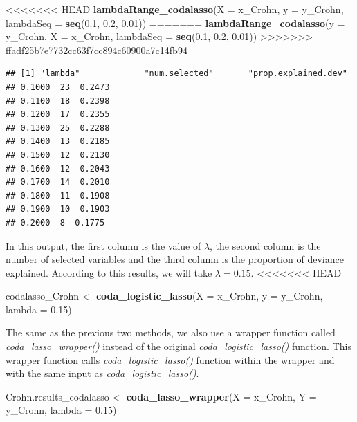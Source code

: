 \documentclass[openany]{book}
\newenvironment{Shaded}{\begin{snugshade}}{\end{snugshade}}
\newcommand{\KeywordTok}[1]{\textcolor[rgb]{0.13,0.29,0.53}{\textbf{#1}}}
\newcommand{\DataTypeTok}[1]{\textcolor[rgb]{0.13,0.29,0.53}{#1}}
\newcommand{\FloatTok}[1]{\textcolor[rgb]{0.00,0.00,0.81}{#1}}
\newcommand{\StringTok}[1]{\textcolor[rgb]{0.31,0.60,0.02}{#1}}
\newcommand{\NormalTok}[1]{#1}
\begin{document}
\begin{Shaded}
\begin{Highlighting}[]
<<<<<<< HEAD
\KeywordTok{lambdaRange_codalasso}\NormalTok{(}\DataTypeTok{X =}\NormalTok{ x_Crohn, }\DataTypeTok{y =}\NormalTok{ y_Crohn, }\DataTypeTok{lambdaSeq =} \KeywordTok{seq}\NormalTok{(}\FloatTok{0.1}\NormalTok{, }\FloatTok{0.2}\NormalTok{, }\FloatTok{0.01}\NormalTok{))}
=======
\KeywordTok{lambdaRange_codalasso}\NormalTok{(}\DataTypeTok{y =}\NormalTok{ y_Crohn, }\DataTypeTok{X =}\NormalTok{ x_Crohn, }\DataTypeTok{lambdaSeq =} \KeywordTok{seq}\NormalTok{(}\FloatTok{0.1}\NormalTok{, }\FloatTok{0.2}\NormalTok{, }\FloatTok{0.01}\NormalTok{))}
>>>>>>> ffadf25b7e7732cc63f7cc894c60900a7c14fb94
\end{Highlighting}
\end{Shaded}

\begin{verbatim}
## [1] "lambda"             "num.selected"       "prop.explained.dev"
## 0.1000  23  0.2473
## 0.1100  18  0.2398
## 0.1200  17  0.2355
## 0.1300  25  0.2288
## 0.1400  13  0.2185
## 0.1500  12  0.2130
## 0.1600  12  0.2043
## 0.1700  14  0.2010
## 0.1800  11  0.1908
## 0.1900  10  0.1903
## 0.2000  8  0.1775
\end{verbatim}

In this output, the first column is the value of \(\lambda\), the second
column is the number of selected variables and the third column is the
proportion of deviance explained. According to this results, we will
take \(\lambda = 0.15\).
<<<<<<< HEAD

\begin{Shaded}
\begin{Highlighting}[]
\NormalTok{codalasso_Crohn <-}\StringTok{ }\KeywordTok{coda_logistic_lasso}\NormalTok{(}\DataTypeTok{X =}\NormalTok{ x_Crohn, }\DataTypeTok{y =}\NormalTok{ y_Crohn, }\DataTypeTok{lambda =} \FloatTok{0.15}\NormalTok{)}
\end{Highlighting}
\end{Shaded}

The same as the previous two methods, we also use a wrapper function
called \emph{coda\_lasso\_wrapper()} instead of the original
\emph{coda\_logistic\_lasso()} function. This wrapper function calls
\emph{coda\_logistic\_lasso()} function within the wrapper and with the
same input as \emph{coda\_logistic\_lasso()}.

\begin{Shaded}
\begin{Highlighting}[]
\NormalTok{Crohn.results_codalasso <-}\StringTok{ }\KeywordTok{coda_lasso_wrapper}\NormalTok{(}\DataTypeTok{X =}\NormalTok{ x_Crohn, }\DataTypeTok{Y =}\NormalTok{ y_Crohn, }
                                              \DataTypeTok{lambda =} \FloatTok{0.15}\NormalTok{)}
\end{Highlighting}
\end{Shaded}
\end{document}
